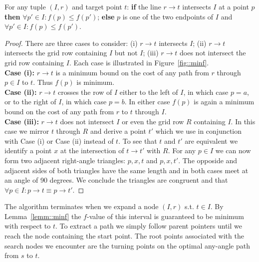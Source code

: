 \begin{lemm}
\label{lemm::minf}
For any tuple $(I, r)$ and target point $t$: 
\textbf{if} the line $r \rightarrow t$ intersects $I$ at a point
$p$ \textbf{then} $\forall p' \in I: f(p) \leq f(p')$;
\textbf{else}
$p$ is one of the two endpoints of $I$ and 
$\forall p' \in I: f(p) \leq f(p')$.
\end{lemm}
\begin{proof}
There are three cases to consider:
(i) $r \rightarrow t$ intersects $I$; (ii) $r \rightarrow t$ intersects
the grid row containing $I$ but not $I$; (iii) $r \rightarrow t$ does 
not intersect the grid row containing $I$. Each
case is illustrated in Figure~\ref{fig::minf}.
\\
\textbf{Case (i):} $r \rightarrow t$ is a minimum bound on the cost of any
path from $r$ through $p \in I$ to $t$. Thus $f(p)$ is minimum.
\\
\textbf{Case (ii):} $r \rightarrow t$ crosses the row of $I$ 
either to the left of $I$, in which
case $p = a$, or to the right of $I$, in which case $p = b$.
In either case $f(p)$ is again a minimum bound on the cost of any
path from $r$ to $t$ through $I$.
\\
\textbf{Case (iii):} $r \rightarrow t$ does not intersect $I$ 
or even the grid row $R$ containing $I$. In this case we mirror
$t$ through $R$ and derive a point $t'$ which we use in
conjunction with Case (i) or Case (ii) instead of $t$.
To see that $t$ and $t'$ are equivalent we identify 
a point $x$ at the intersection of $t \rightarrow t'$ with $R$. 
For any $p \in I$ we can now form two adjacent right-angle
triangles: $p, x, t$ and $p, x, t'$. The opposide and adjacent 
sides of both triangles have the same length and in both cases 
meet at an angle of 90 degrees. We conclude the triangles are
congruent and that 
$\forall p \in I: p \rightarrow t \equiv p \rightarrow t'$.
\end{proof}

The algorithm terminates when we expand a node $(I, r)$ s.t.
$t \in I$. By Lemma~\ref{lemm::minf} the $f$-value of this
interval is guaranteed to be minimum with respect to $t$.
To extract a path we simply follow parent pointers until we
reach the node containing the start point.
The root points associated with the search nodes we encounter
are the turning points on the optimal any-angle path from 
$s$ to $t$. 

